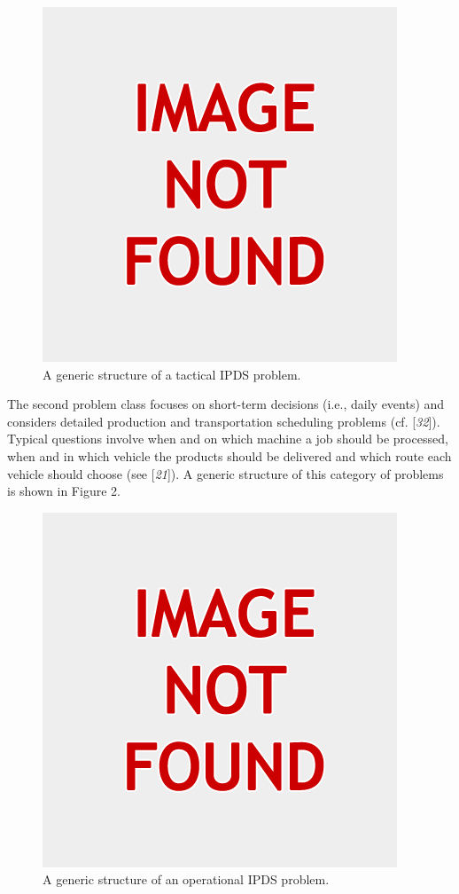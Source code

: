 \begin{figure}[!ht]
\centering
\includegraphics[width=\maxwidth{0.5\textwidth}]{not-found.png}
\caption{A generic structure of a tactical IPDS problem.} 
\label{Figure 1} 
\end{figure} 

\par The second problem class focuses on short-term decisions (i.e., daily events) and
 considers detailed production and transportation scheduling problems (cf. [\textit{32}]). Typical questions involve when and on which
 machine a job should be processed, when and in which vehicle the products should be
 delivered and which route each vehicle should choose (see [\textit{21}]). A generic structure of this category of problems is shown
 in Figure 2.
\begin{figure}[!ht]
\centering
\includegraphics[width=\maxwidth{0.5\textwidth}]{not-found.png}
\caption{A generic structure of an operational IPDS problem.} 
\label{Figure 2} 
\end{figure} 

